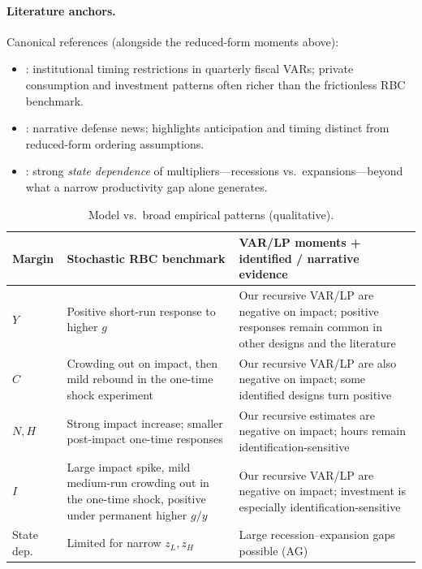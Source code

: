 \documentclass[11pt,a4paper]{article}
\begin{document}
\paragraph{Literature anchors.}
Canonical references (alongside the reduced-form moments above):
\begin{itemize}
  \item \citet{blanchard2002empirical}: institutional timing restrictions in quarterly fiscal VARs; private consumption and investment patterns often richer than the frictionless RBC benchmark.
  \item \citet{ramey2011identifying}: narrative defense news; highlights anticipation and timing distinct from reduced-form ordering assumptions.
  \item \citet{auerbach2012output}: strong \emph{state dependence} of multipliers---recessions vs.\ expansions---beyond what a narrow productivity gap alone generates.
\end{itemize}

\begin{table}[htbp]
  \centering
  \caption{Model vs.\ broad empirical patterns (qualitative).}
  \label{tab:lit}
  \small
  \begin{tabular}{@{}>{\raggedright\arraybackslash}p{2.2cm}>{\raggedright\arraybackslash}p{5.2cm}>{\raggedright\arraybackslash}p{5.0cm}@{}}
    \toprule
    Margin & Stochastic RBC benchmark & VAR/LP moments + identified / narrative evidence \\
    \midrule
    $Y$ & Positive short-run response to higher $g$ & Our recursive VAR/LP are negative on impact; positive responses remain common in other designs and the literature \\
    $C$ & Crowding out on impact, then mild rebound in the one-time shock experiment & Our recursive VAR/LP are also negative on impact; some identified designs turn positive \\
    $N,H$ & Strong impact increase; smaller post-impact one-time responses & Our recursive estimates are negative on impact; hours remain identification-sensitive \\
    $I$ & Large impact spike, mild medium-run crowding out in the one-time shock, positive under permanent higher $g/y$ & Our recursive VAR/LP are negative on impact; investment is especially identification-sensitive \\
    State dep. & Limited for narrow $z_L,z_H$ & Large recession--expansion gaps possible (AG) \\
    \bottomrule
  \end{tabular}
\end{table}
\end{document}
